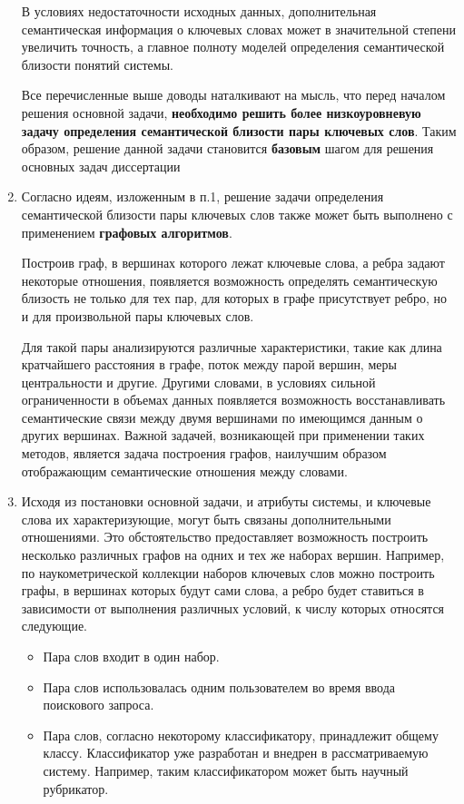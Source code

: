 \begin{enumerate}
        В условиях недостаточности исходных данных, дополнительная семантическая информация о ключевых словах может в значительной степени увеличить точность, а главное полноту моделей определения семантической близости понятий системы. 

        Все перечисленные выше доводы наталкивают на мысль, что перед началом решения основной задачи, \textbf{необходимо решить более низкоуровневую задачу определения семантической близости пары ключевых слов}. Таким образом, решение данной задачи становится \textbf{базовым} шагом для решения основных задач диссертации

    \item Согласно идеям, изложенным в п.1, решение задачи определения семантической близости пары ключевых слов также может быть выполнено с применением \textbf{графовых алгоритмов}.

        Построив граф, в вершинах которого лежат ключевые слова, а ребра задают некоторые отношения, появляется возможность определять семантическую близость не только для тех пар, для которых в графе присутствует ребро, но и для произвольной пары ключевых слов.
        
        Для такой пары анализируются различные характеристики, такие как длина кратчайшего расстояния в графе, поток между парой вершин, меры центральности и другие. Другими словами, в условиях сильной ограниченности в объемах данных появляется возможность восстанавливать семантические связи между двумя вершинами по имеющимся данным о других вершинах. Важной задачей, возникающей при применении таких методов, является задача построения графов, наилучшим образом отображающим семантические отношения между словами.
      
    \item Исходя из постановки основной задачи, и атрибуты системы, и ключевые слова их характеризующие, могут быть связаны дополнительными отношениями. Это обстоятельство предоставляет возможность построить несколько различных графов на одних и тех же наборах вершин. Например, по наукометрической коллекции наборов ключевых слов можно построить графы, в вершинах которых будут сами слова, а ребро будет ставиться в зависимости от выполнения различных условий, к числу которых относятся следующие.
     \begin{itemize}
         \item Пара слов входит в один набор.
         \item Пара слов использовалась одним пользователем во время ввода поискового запроса.
         \item Пара слов, согласно некоторому классификатору, принадлежит общему классу. Классификатор уже разработан и внедрен в рассматриваемую систему. Например, таким классификатором может быть научный рубрикатор.
     \end{itemize}


\end{enumerate}
